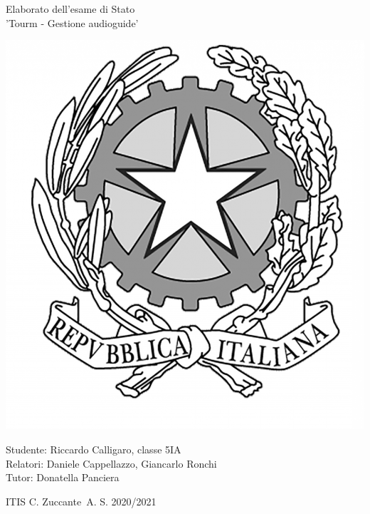 \documentclass[12pt]{article}
\begin{document}
\begin{titlepage}
    \begin{center}
        \vspace*{1cm}

        \Huge
        Elaborato dell'esame di Stato \\\vspace{0.15cm} 'Tourm - Gestione audioguide'

        \vspace{1.5cm}

        \begin{center}
            \includegraphics[scale=0.08]{images/repubblica.png}
        \end{center}

        \normalsize
        Studente: Riccardo Calligaro, classe 5IA\\
        Relatori: Daniele Cappellazzo, Giancarlo Ronchi\\
        Tutor: Donatella Panciera

        \vfill

        ITIS C. Zuccante\
        A. S. 2020/2021

    \end{center}
\end{titlepage}
\end{document}
